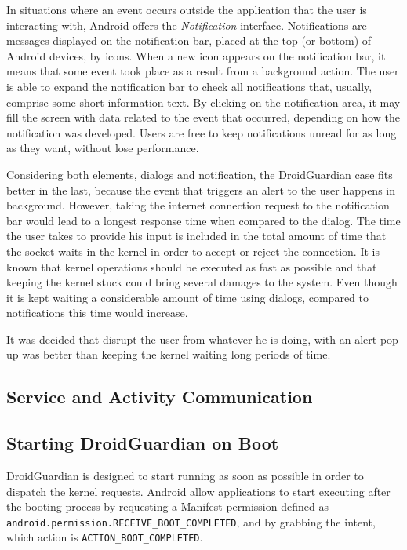 In situations where an event occurs outside the application that the user is interacting with, Android offers the \textit{Notification} interface. Notifications are messages displayed on the notification bar, placed at the top (or bottom) of Android devices, by icons. When a new icon appears on the notification bar, it means that some event took place as a result from a background action. The user is able to expand the notification bar to check all notifications that, usually, comprise some short information text. By clicking on the notification area, it may fill the screen with data related to the event that occurred, depending on how the notification was developed. Users are free to keep notifications unread for as long as they want, without lose performance.

Considering both elements, dialogs and notification, the DroidGuardian case fits better in the last, because the event that triggers an alert to the user happens in background. However, taking the internet connection request to the notification bar would lead to a longest response time when compared to the dialog. The time the user takes to provide his input is included in the total amount of time that the socket waits in the kernel in order to accept or reject the connection. It is known that kernel operations should be executed as fast as possible and that keeping the kernel stuck could bring several damages to the system. Even though it is kept waiting a considerable amount of time using dialogs, compared to notifications this time would increase. 

It was decided that disrupt the user from whatever he is doing, with an alert pop up was better than keeping the kernel waiting long periods of time.

\subsection{Service and Activity Communication}

\subsection{Starting DroidGuardian on Boot}

DroidGuardian is designed to start running as soon as possible in order to dispatch the kernel requests. Android allow applications to start executing after the booting process by requesting a Manifest permission defined as \texttt{android.permission.RECEIVE\_BOOT\_COMPLETED}, and by grabbing the intent, which action is \texttt{ACTION\_BOOT\_COMPLETED}.

